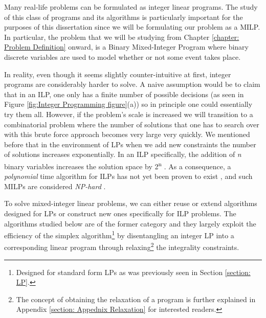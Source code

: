 \vspace{\baselineskip}
\noindent
Many real-life problems can be formulated as integer linear programs. The study of this class of programs and its algorithms is particularly important for the purposes of this dissertation since we will be formulating our problem as a MILP. In particular, the problem that we will be studying from Chapter \ref{chapter: Problem Definition} onward, is a Binary Mixed-Integer Program where binary discrete variables are used to model whether or not some event takes place.\par

 \vspace{\baselineskip}
\noindent
In reality, even though it seems slightly counter-intuitive at first, integer programs are considerably harder to solve. A naive assumption would be to claim that in an ILP, one only has a finite number of possible decisions (as seen in Figure \ref{fig:Integer Programming figure}(a)) so in principle one could essentially try them all. However, if the problem's scale is increased we will transition to a combinatorial problem where the number of solutions that one has to search over with this brute force approach becomes very large very quickly. We mentioned before that in the environment of LPs when we add new constraints the number of solutions increases exponentially. In an ILP specifically, the addition of \textit{n} binary variables increases the solution space by 2\textsuperscript{n} \cite{susteainabletranspaort}. As a consequence, a \textit{polynomial }time algorithm for ILPs has not yet been proven to exist \cite{DUMMY:2}, and such MILPs are considered \textit{NP-hard} \cite{Wedelin1995}.

\vspace{\baselineskip}
\noindent
To solve mixed-integer linear problems, we can either reuse or extend algorithms designed for LPs or construct new ones specifically for ILP problems. The algorithms studied below are of the former category and they largely exploit the efficiency of the simplex algorithm\footnote{Designed for standard form LPs as was previously seen in Section \ref{section: LP}.} by disentangling an integer LP into a corresponding linear program through relaxing\footnote{The concept of obtaining the relaxation of a program is further explained in Appendix \ref{section: Appednix Relaxation} for interested readers.} the integrality constraints. 

